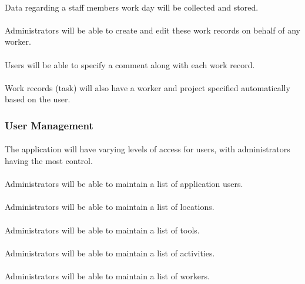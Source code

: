\documentclass[12pt]{article}
\begin{document}
\paragraph{} Data regarding a staff members work day will be collected and stored.
\paragraph{} Administrators will be able to create and edit these work records on behalf of any worker.
\paragraph{} Users will be able to specify a comment along with each work record.
\paragraph{} Work records (task) will also have a worker and project specified automatically based on the user.

\subsubsection{User Management}\label{sec:Users}
\paragraph{} The application will have varying levels of access for users, with administrators having the most control.
\paragraph{} Administrators will be able to maintain a list of application users.
\paragraph{} Administrators will be able to maintain a list of locations.
\paragraph{} Administrators will be able to maintain a list of tools.
\paragraph{} Administrators will be able to maintain a list of activities.
\paragraph{} Administrators will be able to maintain a list of workers.
\end{document}
